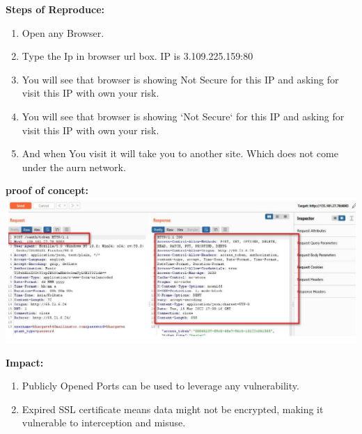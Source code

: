 \documentclass{article}
\begin{document}
\begin{description}[itemsep=2pt, leftmargin=0.2cm]
                    \item \large \textbf{Steps of Reproduce:}
                            \linespread{1.0}
                            \begin{enumerate}[leftmargin=0.5cm]
                             
                             \item \large Open any Browser.

                             \item \large Type the Ip in browser url box. IP is 3.109.225.159:80

                             \item \large You will see that browser is showing Not Secure for this IP and asking for visit this IP with own your risk.

                             \item \large You will see that browser is showing `Not Secure` for this IP and asking for visit this IP with own your risk.

                             \item \large And when You visit it will take you to another site. Which does not come under the aurn network.
                             \end{enumerate}

                    \item \large \textbf{proof of concept: \\ \includegraphics[width=1.0\textwidth]{2.png} } 

                    \item \large \textbf{Impact:}
                            \linespread{1.0}
                            \begin{enumerate}[leftmargin=0.5cm]
                             \item \large Publicly Opened Ports can be used to leverage any vulnerability.
\item \large Expired SSL certificate means data might not be encrypted, making it vulnerable to interception and misuse. 
                            \end{enumerate}  
                            

\end{description}
\end{document}
